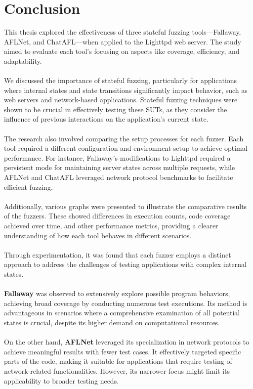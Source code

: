 \chapter{Conclusion} 
This thesis explored the effectiveness of three stateful fuzzing tools—Fallaway, AFLNet, and ChatAFL—when applied to the Lighttpd web server. The study aimed to evaluate each tool's focusing on aspects like coverage, efficiency, and adaptability.
\\\\We discussed the importance of stateful fuzzing, particularly for applications where internal states and state transitions significantly impact behavior, such as web servers and network-based applications. Stateful fuzzing techniques were shown to be crucial in effectively testing these SUTs, as they consider the influence of previous interactions on the application's current state.
\\\\The research also involved comparing the setup processes for each fuzzer. Each tool required a different configuration and environment setup to achieve optimal performance. For instance, Fallaway's modifications to Lighttpd required a persistent mode for maintaining server states across multiple requests, while AFLNet and ChatAFL leveraged network protocol benchmarks to facilitate efficient fuzzing.
\\\\Additionally, various graphs were presented to illustrate the comparative results of the fuzzers. These showed differences in execution counts, code coverage achieved over time, and other performance metrics, providing a clearer understanding of how each tool behaves in different scenarios.
\\\\Through experimentation, it was found that each fuzzer employs a distinct approach to address the challenges of testing applications with complex internal states. 
\\\\\textbf{Fallaway} was observed to extensively explore possible program behaviors, achieving broad coverage by conducting numerous test executions. Its method is advantageous in scenarios where a comprehensive examination of all potential states is crucial, despite its higher demand on computational resources.
\\\\On the other hand, \textbf{AFLNet} leveraged its specialization in network protocols to achieve meaningful results with fewer test cases. It effectively targeted specific parts of the code, making it suitable for applications that require testing of network-related functionalities. However, its narrower focus might limit its applicability to broader testing needs.
